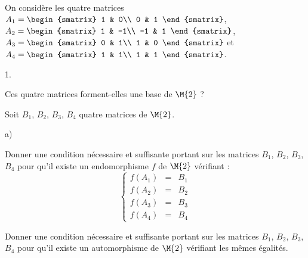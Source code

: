 \documentclass[11pt]{article}%
\begin{document}
\begin{exerciceSP}~\\
  On considère les quatre matrices \quad $A_1 =
  \begin{smatrix}
    1 & 0\\
    0 & 1
  \end{smatrix}$, $A_2 =
  \begin{smatrix}
    1 & -1\\
    -1 & 1
  \end{smatrix}$, $A_3 = 
  \begin{smatrix}
    0 & 1\\
    1 & 0
  \end{smatrix}$ et $A_4 = 
  \begin{smatrix}
    1 & 1\\
    1 & 1
  \end{smatrix}$.
  \begin{noliste}{1.}
    \setlength{\itemsep}{2mm}
    \item Ces quatre matrices forment-elles une base de $\M{2}$ ?
    
    \item Soit $B_1$, $B_2$, $B_3$, $B_4$ quatre matrices de $\M{2}$.
    \begin{noliste}{a)}
    \setlength{\itemsep}{2mm}
      \item Donner une condition nécessaire et suffisante portant sur 
      les matrices $B_1$, $B_2$, $B_3$, $B_4$ pour qu'il existe un 
      endomorphisme $f$ de $\M{2}$ vérifiant :
      \[
        \left\{
        \begin{array}{rcl}
          f(A_1) & = & B_1\\
          f(A_2) & = & B_2\\
          f(A_3) & = & B_3\\
          f(A_4) & = & B_4
        \end{array}
        \right.
      \]
      
      \item Donner une condition nécessaire et suffisante portant sur 
      les matrices $B_1$, $B_2$, $B_3$, $B_4$ pour qu'il existe un 
      automorphisme de $\M{2}$ vérifiant les mêmes égalités.
    \end{noliste}
  \end{noliste}
\end{exerciceSP}



\newpage
\end{document}
